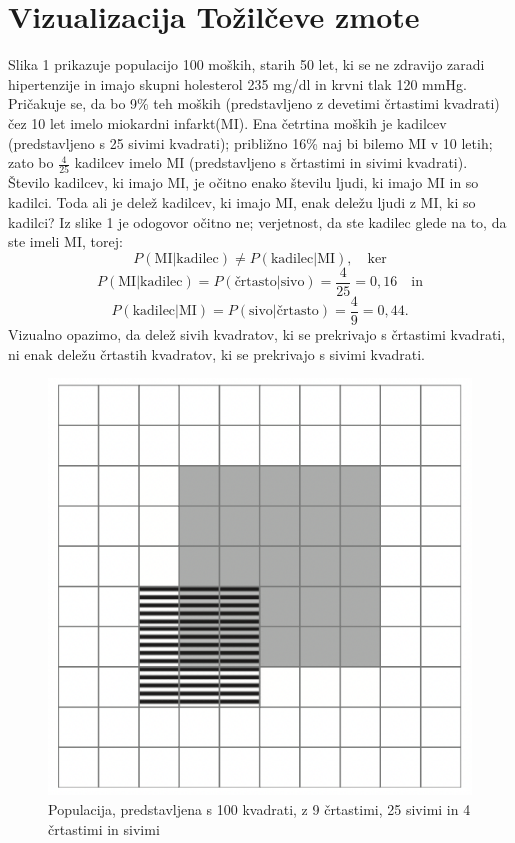 \documentclass[a4paper,12pt]{article}
\begin{document}
\section{Vizualizacija Tožilčeve zmote}
Slika 1 prikazuje populacijo 100 moških, starih 50 let, ki se ne zdravijo zaradi hipertenzije in imajo skupni holesterol 235 mg/dl in krvni tlak 120 mmHg. Pričakuje
se, da bo 9\% teh moških (predstavljeno z devetimi črtastimi kvadrati) čez 10 let imelo miokardni infarkt(MI). Ena četrtina moških je kadilcev (predstavljeno s 25 
sivimi kvadrati); približno 16\% naj bi bilemo MI v 10 letih; zato bo $\frac{4}{25}$ kadilcev imelo MI (predstavljeno s črtastimi in sivimi kvadrati). \\
Število kadilcev, ki imajo MI, je očitno enako številu ljudi, ki imajo MI in so kadilci. Toda ali je delež kadilcev, ki imajo MI, enak deležu ljudi z MI, ki so kadilci? Iz 
slike 1 je odogovor očitno ne; verjetnost, da ste kadilec glede na to, da ste imeli MI, torej:
\[ P(\text{MI} \lvert \text{kadilec}) \ne P(\text{kadilec} \lvert \text{MI}), \quad \text{ker}\]
\[ P(\text{MI} \lvert \text{kadilec}) = P(\text{črtasto} \lvert \text{sivo}) = \frac{4}{25} = 0,16 \quad \text{in}\]
\[P(\text{kadilec} \lvert \text{MI}) = P(\text{sivo} \lvert \text{črtasto}) = \frac{4}{9} = 0,44.\]
Vizualno opazimo, da delež sivih kvadratov, ki se prekrivajo s črtastimi kvadrati, ni enak deležu črtastih kvadratov, ki se prekrivajo s sivimi kvadrati. 

\begin{figure}[!ht]
    \centering
    \label{fig:slika1}
    \includegraphics[scale=0.45]{slika1.png}
    \caption{Populacija, predstavljena s 100 kvadrati, z 9 črtastimi, 25 sivimi in 4 črtastimi in sivimi}\vspace{2mm}
 \end{figure}
\end{document}
